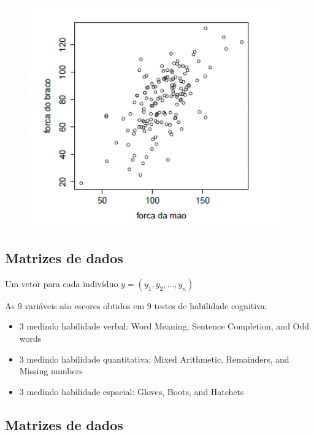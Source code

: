 \documentclass[
  letterpaper,
  DIV=11,
  numbers=noendperiod]{scrartcl}
\providecommand{\tightlist}{%
  \setlength{\itemsep}{0pt}\setlength{\parskip}{0pt}}\usepackage{longtable,booktabs,array}
\begin{document}
\begin{figure}

{\centering \includegraphics{figs/Aula07/ex1.png}

}

\end{figure}

\hypertarget{matrizes-de-dados}{%
\subsection{Matrizes de dados}\label{matrizes-de-dados}}

Um vetor para cada indivíduo \(y = (y_1,y_2,\ldots,y_n)\)

As 9 variáveis são escores obtidos em 9 testes de habilidade cognitiva:

\begin{itemize}
\tightlist
\item
  3 medindo habilidade verbal: Word Meaning, Sentence Completion, and
  Odd words
\item
  3 medindo habilidade quantitativa: Mixed Arithmetic, Remainders, and
  Missing numbers
\item
  3 medindo habilidade espacial: Gloves, Boots, and Hatchets
\end{itemize}

\hypertarget{matrizes-de-dados-1}{%
\subsection{Matrizes de dados}\label{matrizes-de-dados-1}}
\end{document}

